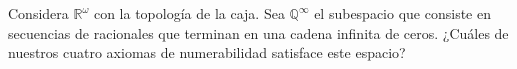 
  \item[*17.] Considera $\mathbb{R}^{\omega}$ con la topología de la caja. Sea $\mathbb{Q}^{\infty}$ el subespacio que consiste en secuencias de racionales que terminan en una cadena infinita de ceros.  
    ¿Cuáles de nuestros cuatro axiomas de numerabilidad satisface este espacio?

   